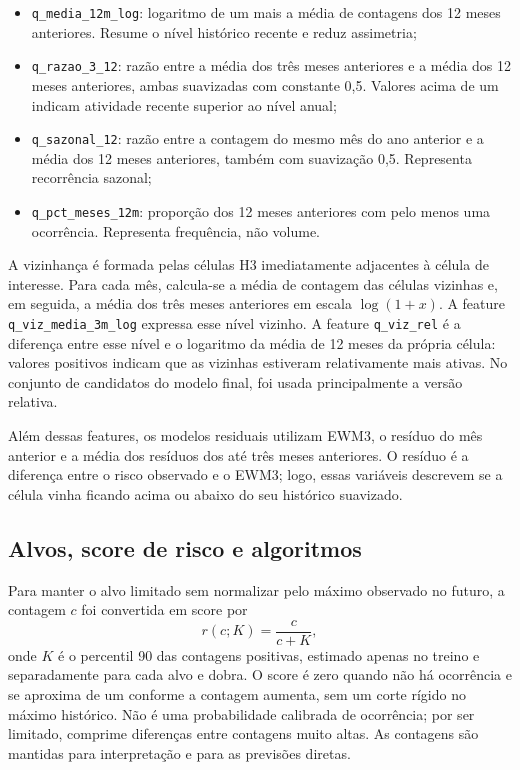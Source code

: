 \documentclass[12pt]{article}
\begin{document}
\begin{itemize}
  \item \texttt{q\_media\_12m\_log}: logaritmo de um mais a média de contagens dos 12 meses anteriores. Resume o nível histórico recente e reduz assimetria;
  \item \texttt{q\_razao\_3\_12}: razão entre a média dos três meses anteriores e a média dos 12 meses anteriores, ambas suavizadas com constante 0,5. Valores acima de um indicam atividade recente superior ao nível anual;
  \item \texttt{q\_sazonal\_12}: razão entre a contagem do mesmo mês do ano anterior e a média dos 12 meses anteriores, também com suavização 0,5. Representa recorrência sazonal;
  \item \texttt{q\_pct\_meses\_12m}: proporção dos 12 meses anteriores com pelo menos uma ocorrência. Representa frequência, não volume.
\end{itemize}

A vizinhança é formada pelas células H3 imediatamente adjacentes à célula de interesse. Para cada mês, calcula-se a média de contagem das células vizinhas e, em seguida, a média dos três meses anteriores em escala $\log(1+x)$. A feature \texttt{q\_viz\_media\_3m\_log} expressa esse nível vizinho. A feature \texttt{q\_viz\_rel} é a diferença entre esse nível e o logaritmo da média de 12 meses da própria célula: valores positivos indicam que as vizinhas estiveram relativamente mais ativas. No conjunto de candidatos do modelo final, foi usada principalmente a versão relativa.

Além dessas features, os modelos residuais utilizam EWM3, o resíduo do mês anterior e a média dos resíduos dos até três meses anteriores. O resíduo é a diferença entre o risco observado e o EWM3; logo, essas variáveis descrevem se a célula vinha ficando acima ou abaixo do seu histórico suavizado.

\subsection{Alvos, score de risco e algoritmos}

Para manter o alvo limitado sem normalizar pelo máximo observado no futuro, a contagem $c$ foi convertida em score por
\begin{equation}
  r(c;K)=\frac{c}{c+K},
\end{equation}
onde $K$ é o percentil 90 das contagens positivas, estimado apenas no treino e separadamente para cada alvo e dobra. O score é zero quando não há ocorrência e se aproxima de um conforme a contagem aumenta, sem um corte rígido no máximo histórico. Não é uma probabilidade calibrada de ocorrência; por ser limitado, comprime diferenças entre contagens muito altas. As contagens são mantidas para interpretação e para as previsões diretas.
\end{document}
